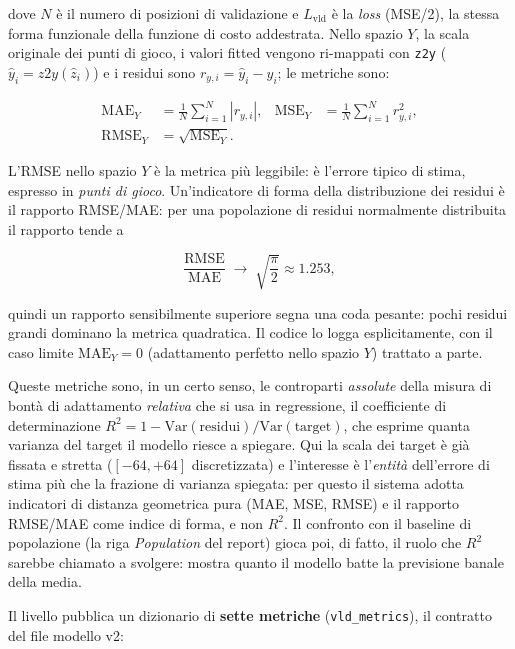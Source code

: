 dove $N$ è il numero di posizioni di validazione e $L_{\mathrm{vld}}$ è la
\emph{loss} (MSE/2), la stessa forma funzionale della funzione di costo
addestrata. Nello spazio $Y$, la scala originale dei punti di gioco, i valori
fitted vengono ri-mappati con \texttt{z2y} ($\hat{y}_i = \mathit{z2y}
(\hat{z}_i)$) e i residui sono $r_{y,i} = \hat{y}_i - y_i$; le metriche sono:

\begin{align}
  \mathrm{MAE}_{Y} &= \frac{1}{N} \sum_{i=1}^{N} \left| r_{y,i} \right|,
  &
  \mathrm{MSE}_{Y} &= \frac{1}{N} \sum_{i=1}^{N} r_{y,i}^{2}, \\
  \mathrm{RMSE}_{Y} &= \sqrt{\mathrm{MSE}_{Y}}.
\end{align}

L'RMSE nello spazio $Y$ è la metrica più leggibile: è l'errore tipico di
stima, espresso in \emph{punti di gioco}. Un'indicatore di forma della
distribuzione dei residui è il rapporto RMSE/MAE: per una popolazione di
residui normalmente distribuita il rapporto tende a

\begin{equation}
  \frac{\mathrm{RMSE}}{\mathrm{MAE}} \;\longrightarrow\;
  \sqrt{\frac{\pi}{2}} \approx 1.253,
\end{equation}

quindi un rapporto sensibilmente superiore segna una coda pesante: pochi
residui grandi dominano la metrica quadratica. Il codice lo logga esplicitamente,
con il caso limite $\mathrm{MAE}_{Y} = 0$ (adattamento perfetto nello spazio
$Y$) trattato a parte.

Queste metriche sono, in un certo senso, le controparti \emph{assolute}
della misura di bontà di adattamento \emph{relativa} che si usa in
regressione, il coefficiente di determinazione $R^{2} = 1 -
\mathrm{Var}(\text{residui})/\mathrm{Var}(\text{target})$, che esprime
quanta varianza del target il modello riesce a spiegare. Qui la scala dei
target è già fissata e stretta ($[-64, +64]$ discretizzata) e l'interesse
è l'\emph{entità} dell'errore di stima più che la frazione di varianza
spiegata: per questo il sistema adotta indicatori di distanza geometrica
pura (MAE, MSE, RMSE) e il rapporto RMSE/MAE come indice di forma, e non
$R^{2}$. Il confronto con il baseline di popolazione (la riga
\emph{Population} del report) gioca poi, di fatto, il ruolo che $R^{2}$
sarebbe chiamato a svolgere: mostra quanto il modello batte la previsione
banale della media.

Il livello pubblica un dizionario di \textbf{sette metriche}
(\texttt{vld\_metrics}), il contratto del file modello v2:

